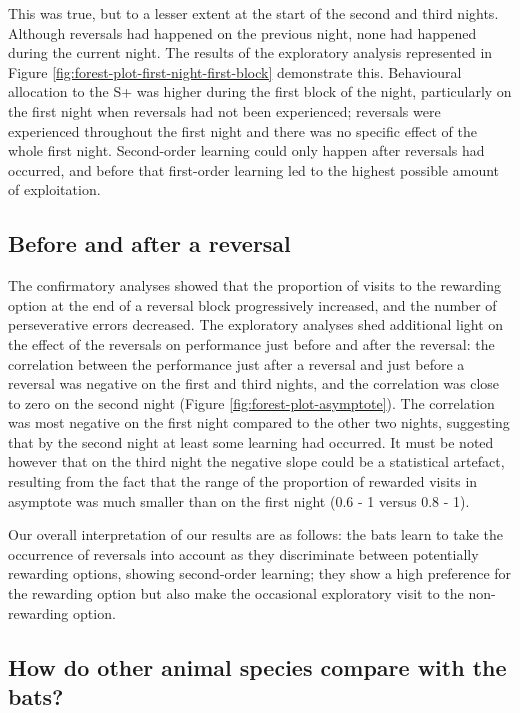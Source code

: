 \documentclass[
]{article}
\begin{document}
This was true, but to a lesser extent at the start of the second and third nights. Although reversals had happened on the previous night, none had happened during the current night. The results of the exploratory analysis represented in Figure \ref{fig:forest-plot-first-night-first-block} demonstrate this. Behavioural allocation to the S+ was higher during the first block of the night, particularly on the first night when reversals had not been experienced; reversals were experienced throughout the first night and there was no specific effect of the whole first night. Second-order learning could only happen after reversals had occurred, and before that first-order learning led to the highest possible amount of exploitation.

\hypertarget{before-and-after-a-reversal}{%
\subsection{Before and after a reversal}\label{before-and-after-a-reversal}}

The confirmatory analyses showed that the proportion of visits to the rewarding option at the end of a reversal block progressively increased, and the number of perseverative errors decreased. The exploratory analyses shed additional light on the effect of the reversals on performance just before and after the reversal: the correlation between the performance just after a reversal and just before a reversal was negative on the first and third nights, and the correlation was close to zero on the second night (Figure \ref{fig:forest-plot-asymptote}). The correlation was most negative on the first night compared to the other two nights, suggesting that by the second night at least some learning had occurred. It must be noted however that on the third night the negative slope could be a statistical artefact, resulting from the fact that the range of the proportion of rewarded visits in asymptote was much smaller than on the first night (0.6 - 1 versus 0.8 - 1).

Our overall interpretation of our results are as follows: the bats learn to take the occurrence of reversals into account as they discriminate between potentially rewarding options, showing second-order learning; they show a high preference for the rewarding option but also make the occasional exploratory visit to the non-rewarding option.

\hypertarget{how-do-other-animal-species-compare-with-the-bats}{%
\subsection{How do other animal species compare with the bats?}\label{how-do-other-animal-species-compare-with-the-bats}}
\end{document}
